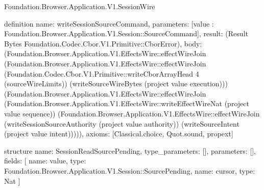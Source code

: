 \begin{lexlean}{Foundation.Browser.Application.V1.SessionWire}
\begin{semanticmodule}
definition{
  name: writeSessionSourceCommand,
  parameters: [value : Foundation.Browser.Application.V1.Session::SourceCommand],
  result: (Result Bytes Foundation.Codec.Cbor.V1.Primitive::CborError),
  body: (Foundation.Browser.Application.V1.EffectsWire::effectWireJoin (Foundation.Browser.Application.V1.EffectsWire::effectWireJoin (Foundation.Codec.Cbor.V1.Primitive::writeCborArrayHead 4 (sourceWireLimits)) (writeSourceWireBytes (project value execution))) (Foundation.Browser.Application.V1.EffectsWire::effectWireJoin (Foundation.Browser.Application.V1.EffectsWire::writeEffectWireNat (project value sequence)) (Foundation.Browser.Application.V1.EffectsWire::effectWireJoin (writeSessionSourceAuthority (project value authority)) (writeSourceIntent (project value intent))))),
  axioms: [Classical.choice, Quot.sound, propext]
}

structure{
  name: SessionReadSourcePending,
  type_parameters: [],
  parameters: [],
  fields: [
    {name: value, type: Foundation.Browser.Application.V1.Session::SourcePending},
    {name: cursor, type: Nat}
  ]
}


\end{semanticmodule}
\end{lexlean}
